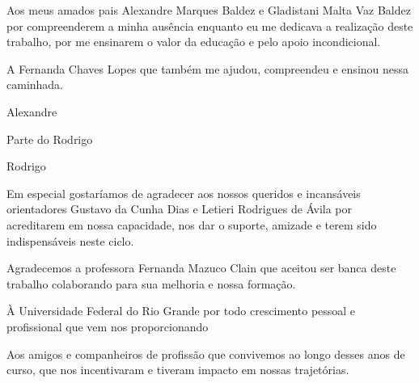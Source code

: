 Aos meus amados pais Alexandre Marques Baldez e Gladistani Malta Vaz Baldez por compreenderem a minha ausência enquanto eu me dedicava a realização deste trabalho, por me ensinarem o valor da educação e pelo apoio incondicional.

A Fernanda Chaves Lopes que também me ajudou, compreendeu e ensinou nessa caminhada.

\begin{flushright}Alexandre\end{flushright}

Parte do Rodrigo

\begin{flushright}Rodrigo\end{flushright}
    
Em especial gostaríamos de agradecer aos nossos queridos e incansáveis orientadores Gustavo da Cunha Dias e Letieri Rodrigues de Ávila por acreditarem em nossa capacidade, nos dar o suporte, amizade e terem sido indispensáveis neste ciclo.

Agradecemos a professora Fernanda Mazuco Clain que aceitou ser banca deste trabalho colaborando para sua melhoria e nossa formação.

À Universidade Federal do Rio Grande por todo crescimento pessoal e profissional que vem nos proporcionando

Aos amigos e companheiros de profissão que convivemos ao longo desses anos de curso, que nos incentivaram e tiveram impacto em nossas trajetórias.
